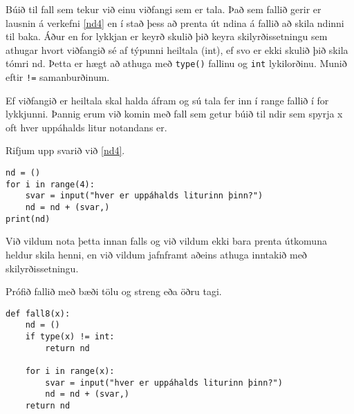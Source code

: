 \begin{exercise}\label{fun8}
Búið til fall sem tekur við einu viðfangi sem er tala.
Það sem fallið gerir er lausnin á verkefni \ref{nd4} en í stað þess að prenta út ndina á fallið að skila ndinni til baka.
Áður en for lykkjan er keyrð skulið þið keyra skilyrðissetningu sem athugar hvort viðfangið sé af týpunni heiltala (int), ef svo er ekki skulið þið skila tómri nd.
Þetta er hægt að athuga með \texttt{type()} fallinu og \texttt{int} lykilorðinu.
Munið eftir \texttt{!=} samanburðinum.

Ef viðfangið er heiltala skal halda áfram og sú tala fer inn í range fallið í for lykkjunni.
Þannig erum við komin með fall sem getur búið til ndir sem spyrja x oft hver uppáhalds litur notandans er.
\end{exercise}
\begin{Answer}[ref={fun8}]
Rifjum upp svarið við \ref{nd4}.
\begin{lstlisting}
nd = ()
for i in range(4):
	svar = input("hver er uppáhalds liturinn þinn?")
	nd = nd + (svar,)
print(nd)\end{lstlisting}

Við vildum nota þetta innan falls og við vildum ekki bara prenta útkomuna heldur skila henni, en við vildum jafnframt aðeins athuga inntakið með skilyrðissetningu.

Prófið fallið með bæði tölu og streng eða öðru tagi.

\begin{lstlisting}
def fall8(x):
	nd = ()
	if type(x) != int:
		return nd

	for i in range(x):
		svar = input("hver er uppáhalds liturinn þinn?")
		nd = nd + (svar,)
	return nd\end{lstlisting}
\newpage
\end{Answer}

